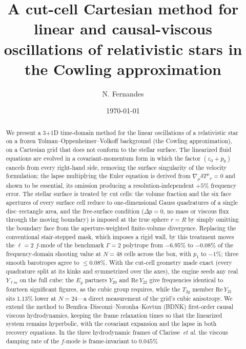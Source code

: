 \documentclass[aps,prd,reprint,amsmath,amssymb,nofootinbib,longbibliography,superscriptaddress]{revtex4-2}
\newcommand{\BDNK}{BDNK}
\begin{document}
\title{A cut-cell Cartesian method for linear and causal-viscous oscillations of relativistic
stars in the Cowling approximation}

\author{N. Fernandes}

\date{\today}

\begin{abstract}
We present a 3+1D time-domain method for the linear oscillations of a relativistic star on a
frozen Tolman--Oppenheimer--Volkoff background (the Cowling approximation), on a Cartesian grid
that does not conform to the stellar surface. The linearized fluid equations are evolved in a
covariant-momentum form in which the factor $(\varepsilon_0+p_0)$ cancels from every right-hand
side, removing the surface singularity of the velocity formulation; the lapse multiplying the
Euler equation is derived from $\nabla_\mu\delta T^{\mu}{}_\nu = 0$ and shown to be essential,
its omission producing a resolution-independent $+5\%$ frequency error. The stellar surface is
treated by cut cells: the volume fraction and the six face apertures of every surface cell reduce
to one-dimensional Gauss quadratures of a single disc--rectangle area, and the free-surface
condition ($\Delta p = 0$, no mass or viscous flux through the moving boundary) is imposed at the
true sphere $r=R$ by simply omitting the boundary face from the aperture-weighted finite-volume
divergence. Replacing the conventional stair-stepped mask, which imposes a rigid wall, by this
treatment moves the $\ell=2$ $f$-mode of the benchmark $\Gamma=2$ polytrope from $-6.95\%$ to
$-0.08\%$ of the frequency-domain shooting value at $N=48$ cells across the box, with $p_1$ to
$-1\%$; three smooth barotropes agree to $\le0.08\%$. With the cut-cell geometry made exact
(every quadrature split at its kinks and symmetrized over the axes), the engine seeds any real
$Y_{\ell m}$ on the full cube: the $E_g$ partners $Y_{20}$ and $\mathrm{Re}\,Y_{22}$ give
frequencies identical to fourteen significant figures, as the cubic group requires, while the
$T_{2g}$ member $\mathrm{Re}\,Y_{21}$ sits $1.13\%$ lower at $N=24$---a direct measurement of the
grid's cubic anisotropy. We extend the method to
Bemfica--Disconzi--Noronha--Kovtun (\BDNK) first-order causal viscous hydrodynamics, keeping the
frame relaxation times so that the linearized system remains hyperbolic, with the covariant
expansion and the lapse in both recovery equations. In the three hydrodynamic frames of
Clarisse~\emph{et al.} the viscous damping rate of the $f$-mode is frame-invariant to $0.045\%$

\end{abstract}
\end{document}

